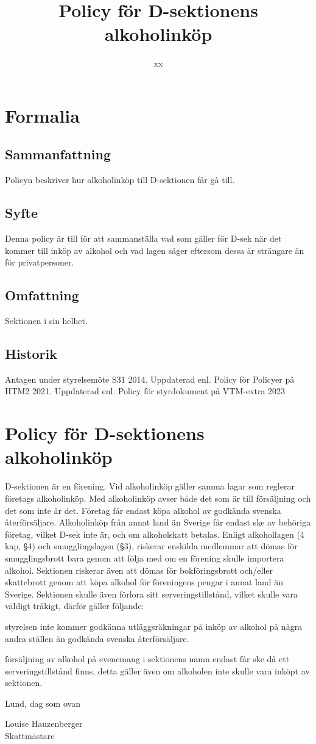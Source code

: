\documentclass{dsekprotokoll}
\title{Policy för D-sektionens alkoholinköp}
\author{xx}
\begin{document}
\maketitle
\section{Formalia}
\subsection{Sammanfattning}
Policyn beskriver hur alkoholinköp till D-sektionen får gå till.
\subsection{Syfte}
Denna policy är till för att sammanställa vad som gäller för D-sek när
det kommer till inköp av alkohol och vad lagen säger eftersom dessa är strängare än för privatpersoner.
\subsection{Omfattning}
Sektionen i sin helhet.
\subsection{Historik}
Antagen under styrelsemöte S31 2014.
Uppdaterad enl. Policy för Policyer på HTM2 2021. Uppdaterad enl. Policy för styrdokument på VTM-extra 2023
\section{Policy för D-sektionens alkoholinköp}

D-sektionen är en förening. Vid alkoholinköp gäller samma lagar som reglerar
företags alkoholinköp. Med alkoholinköp avser både det som är till försäljning och det som inte är det.
Företag får endast köpa alkohol av godkända svenska återförsäljare. Alkoholinköp från annat
land än Sverige får endast ske av behöriga företag, vilket D-sek inte är, och om alkoholskatt
betalas. Enligt alkohollagen (4 kap, §4) och smugglingslagen (§3), riskerar enskilda medlemmar att dömas för smugglingsbrott bara genom att följa med om en förening skulle importera
alkohol. Sektionen riskerar även att dömas för bokföringsbrott och/eller skattebrott genom att
köpa alkohol för föreningens pengar i annat land än Sverige. Sektionen skulle även förlora sitt
serveringstillstånd, vilket skulle vara väldigt tråkigt, därför gäller följande:
\begin{attlista}
	\item styrelsen inte kommer godkänna utläggsräkningar på inköp av alkohol på några andra ställen än godkända svenska återförsäljare.
	\item försäljning av alkohol på evenemang i sektionens namn endast får ske då ett serveringstillstånd finns, detta gäller även om alkoholen inte skulle vara inköpt av sektionen.

\end{attlista}



Lund, dag som ovan\newline

Louise Hauzenberger\\
Skattmästare
\end{document}
